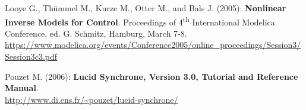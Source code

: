 \documentclass[10pt,a4paper]{report}
\begin{document}
Looye G., Thümmel M., Kurze M., Otter M., and Bals J. (2005):
\textbf{Nonlinear Inverse Models for Control}. Proceedings of
4\textsuperscript{th} International Modelica Conference, ed. G. Schmitz,
Hamburg, March 7-8.\\
\url{https://www.modelica.org/events/Conference2005/online_proceedings/Session3/Session3c3.pdf}

Pouzet M. (2006): \textbf{Lucid Synchrone, Version 3.0, Tutorial and
Reference Manual}.\\
\url{http://www.di.ens.fr/~pouzet/lucid-synchrone/}
\end{document}
